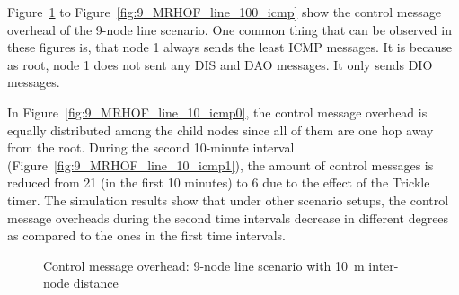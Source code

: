 Figure~\ref{fig:9_MRHOF_line_10_icmp} to Figure~\ref{fig:9_MRHOF_line_100_icmp} show the control message overhead  of the 9-node line scenario. One common thing that can be observed in these figures is, that node 1 always sends the least ICMP messages. It is because as root, node 1 does not sent any DIS and DAO messages. It only sends DIO messages.

In Figure~\ref{fig:9_MRHOF_line_10_icmp0}, the control message overhead is equally distributed among the child nodes since all of them are one hop away from the root. During the second 10-minute interval (Figure~\ref{fig:9_MRHOF_line_10_icmp1}), the amount of control messages is reduced from 21 (in the first 10 minutes) to 6 due to the effect of the Trickle timer. The simulation results show that under other scenario setups, the control message overheads during the second time intervals decrease in different degrees as compared to the ones in the first time intervals.

\begin{figure}[p]
  \begin{center}
    \leavevmode
    \caption{Control message overhead: 9-node line scenario with 10~m inter-node distance}
    \label{fig:9_MRHOF_line_10_icmp}
  \end{center}
   \vspace{-20pt}
\end{figure}

